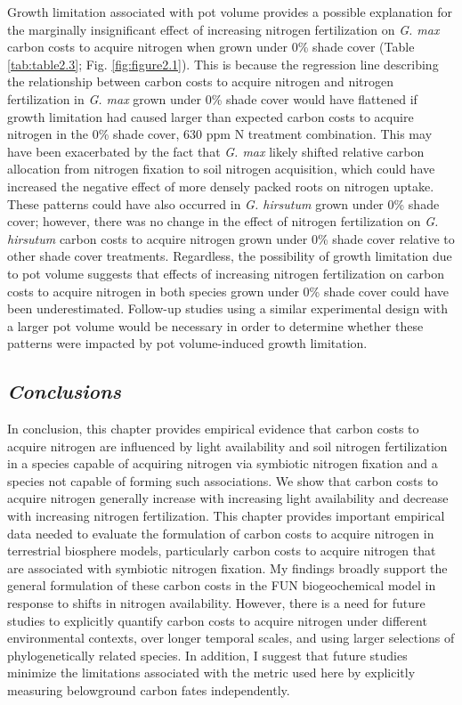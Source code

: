 Growth limitation associated with pot volume provides a possible explanation for the marginally insignificant effect of increasing nitrogen fertilization on \textit{G. max} carbon costs to acquire nitrogen when grown under 0\% shade cover (Table \ref{tab:table2.3}; Fig. \ref{fig:figure2.1}). This is because the regression line describing the relationship between carbon costs to acquire nitrogen and nitrogen fertilization in \textit{G. max} grown under 0\% shade cover would have flattened if growth limitation had caused larger than expected carbon costs to acquire nitrogen in the 0\% shade cover, 630 ppm N treatment combination. This may have been exacerbated by the fact that \textit{G. max} likely shifted relative carbon allocation from nitrogen fixation to soil nitrogen acquisition, which could have increased the negative effect of more densely packed roots on nitrogen uptake. These patterns could have also occurred in \textit{G. hirsutum} grown under 0\% shade cover; however, there was no change in the effect of nitrogen fertilization on \textit{G. hirsutum} carbon costs to acquire nitrogen grown under 0\% shade cover relative to other shade cover treatments. Regardless, the possibility of growth limitation due to pot volume suggests that effects of increasing nitrogen fertilization on carbon costs to acquire nitrogen in both species grown under 0\% shade cover could have been underestimated. Follow-up studies using a similar experimental design with a larger pot volume would be necessary in order to determine whether these patterns were impacted by pot volume-induced growth limitation.

\subsection{\textit{Conclusions}}
In conclusion, this chapter provides empirical evidence that carbon costs to acquire nitrogen are influenced by light availability and soil nitrogen fertilization in a species capable of acquiring nitrogen via symbiotic nitrogen fixation and a species not capable of forming such associations. We show that carbon costs to acquire nitrogen generally increase with increasing light availability and decrease with increasing nitrogen fertilization. This chapter provides important empirical data needed to evaluate the formulation of carbon costs to acquire nitrogen in terrestrial biosphere models, particularly carbon costs to acquire nitrogen that are associated with symbiotic nitrogen fixation. My findings broadly support the general formulation of these carbon costs in the FUN biogeochemical model in response to shifts in nitrogen availability. However, there is a need for future studies to explicitly quantify carbon costs to acquire nitrogen under different environmental contexts, over longer temporal scales, and using larger selections of phylogenetically related species. In addition, I suggest that future studies minimize the limitations associated with the metric used here by explicitly measuring belowground carbon fates independently.

